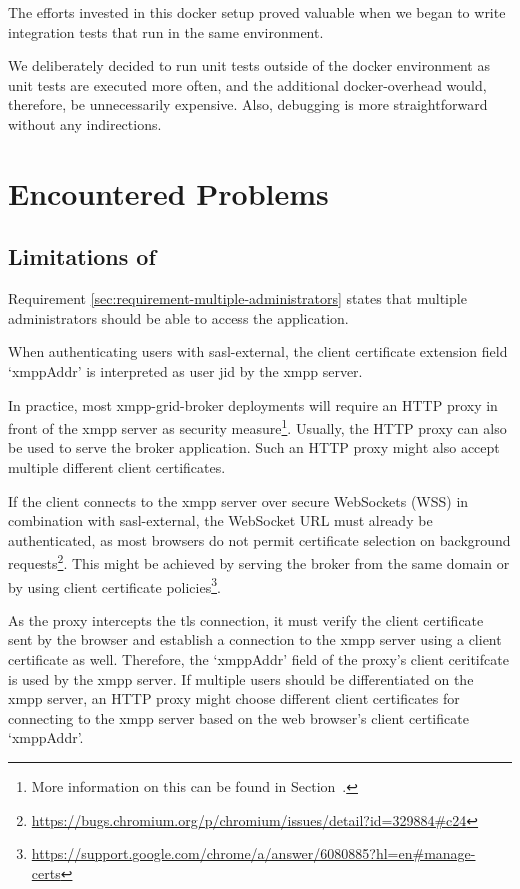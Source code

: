 The efforts invested in this docker setup proved valuable when we began to write integration tests that run in the same environment.

We deliberately decided to run unit tests outside of the docker environment as unit tests are executed more often, and the additional docker-overhead would, therefore, be unnecessarily expensive.
Also, debugging is more straightforward without any indirections.

\section{Encountered Problems}\label{encountered-problems}

\subsection{Limitations of \emph{}}\label{sec:limitations-of-requirement-multiple-administrators}

Requirement \ref{sec:requirement-multiple-administrators} states that multiple administrators should be able to access the application.

When authenticating users with \gls{sasl-external}, the client certificate extension field `xmppAddr' is interpreted as user \gls{jid} by the \gls{xmpp} server.

In practice, most \gls{xmpp-grid-broker} deployments will require an HTTP proxy in front of the \gls{xmpp} server as security measure\footnote{
More information on this can be found in Section~.}.
Usually, the HTTP proxy can also be used to serve the \gls{broker} application.
Such an HTTP proxy might also accept multiple different client certificates.

If the client connects to the \gls{xmpp} server over secure WebSockets (WSS) in combination with \gls{sasl-external}, the WebSocket URL must already be authenticated, as most browsers do not permit certificate selection on background requests\footnote{\url{https://bugs.chromium.org/p/chromium/issues/detail?id=329884\#c24}}.
This might be achieved by serving the \gls{broker} from the same domain or by using client certificate policies\footnote{\url{https://support.google.com/chrome/a/answer/6080885?hl=en\#manage-certs}}.

As the proxy intercepts the \gls{tls} connection, it must verify the client certificate sent by the browser and establish a connection to the \gls{xmpp} server using a client certificate as well.
Therefore, the `xmppAddr' field of the proxy's client ceritifcate is used by the \gls{xmpp} server.
If multiple users should be differentiated on the \gls{xmpp} server, an HTTP proxy might choose different client certificates for connecting to the \gls{xmpp} server based on the web browser's client certificate `xmppAddr'.


